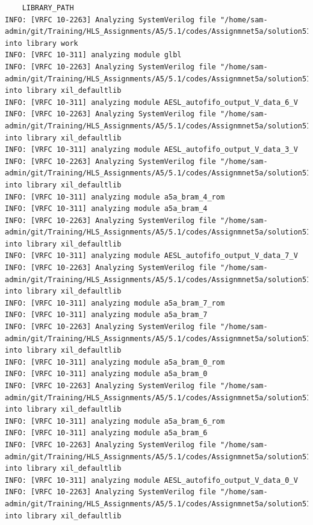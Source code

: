 \documentclass{article}
\begin{document}
\begin{lstlisting}
    LIBRARY_PATH
INFO: [VRFC 10-2263] Analyzing SystemVerilog file "/home/sam-admin/git/Training/HLS_Assignments/A5/5.1/codes/Assignmnet5a/solution51a/sim/verilog/glbl.v" into library work
INFO: [VRFC 10-311] analyzing module glbl
INFO: [VRFC 10-2263] Analyzing SystemVerilog file "/home/sam-admin/git/Training/HLS_Assignments/A5/5.1/codes/Assignmnet5a/solution51a/sim/verilog/AESL_autofifo_output_V_data_6_V.v" into library xil_defaultlib
INFO: [VRFC 10-311] analyzing module AESL_autofifo_output_V_data_6_V
INFO: [VRFC 10-2263] Analyzing SystemVerilog file "/home/sam-admin/git/Training/HLS_Assignments/A5/5.1/codes/Assignmnet5a/solution51a/sim/verilog/AESL_autofifo_output_V_data_3_V.v" into library xil_defaultlib
INFO: [VRFC 10-311] analyzing module AESL_autofifo_output_V_data_3_V
INFO: [VRFC 10-2263] Analyzing SystemVerilog file "/home/sam-admin/git/Training/HLS_Assignments/A5/5.1/codes/Assignmnet5a/solution51a/sim/verilog/a5a_bram_4.v" into library xil_defaultlib
INFO: [VRFC 10-311] analyzing module a5a_bram_4_rom
INFO: [VRFC 10-311] analyzing module a5a_bram_4
INFO: [VRFC 10-2263] Analyzing SystemVerilog file "/home/sam-admin/git/Training/HLS_Assignments/A5/5.1/codes/Assignmnet5a/solution51a/sim/verilog/AESL_autofifo_output_V_data_7_V.v" into library xil_defaultlib
INFO: [VRFC 10-311] analyzing module AESL_autofifo_output_V_data_7_V
INFO: [VRFC 10-2263] Analyzing SystemVerilog file "/home/sam-admin/git/Training/HLS_Assignments/A5/5.1/codes/Assignmnet5a/solution51a/sim/verilog/a5a_bram_7.v" into library xil_defaultlib
INFO: [VRFC 10-311] analyzing module a5a_bram_7_rom
INFO: [VRFC 10-311] analyzing module a5a_bram_7
INFO: [VRFC 10-2263] Analyzing SystemVerilog file "/home/sam-admin/git/Training/HLS_Assignments/A5/5.1/codes/Assignmnet5a/solution51a/sim/verilog/a5a_bram_0.v" into library xil_defaultlib
INFO: [VRFC 10-311] analyzing module a5a_bram_0_rom
INFO: [VRFC 10-311] analyzing module a5a_bram_0
INFO: [VRFC 10-2263] Analyzing SystemVerilog file "/home/sam-admin/git/Training/HLS_Assignments/A5/5.1/codes/Assignmnet5a/solution51a/sim/verilog/a5a_bram_6.v" into library xil_defaultlib
INFO: [VRFC 10-311] analyzing module a5a_bram_6_rom
INFO: [VRFC 10-311] analyzing module a5a_bram_6
INFO: [VRFC 10-2263] Analyzing SystemVerilog file "/home/sam-admin/git/Training/HLS_Assignments/A5/5.1/codes/Assignmnet5a/solution51a/sim/verilog/AESL_autofifo_output_V_data_0_V.v" into library xil_defaultlib
INFO: [VRFC 10-311] analyzing module AESL_autofifo_output_V_data_0_V
INFO: [VRFC 10-2263] Analyzing SystemVerilog file "/home/sam-admin/git/Training/HLS_Assignments/A5/5.1/codes/Assignmnet5a/solution51a/sim/verilog/AESL_autofifo_output_V_data_2_V.v" into library xil_defaultlib

\end{lstlisting}
\end{document}
